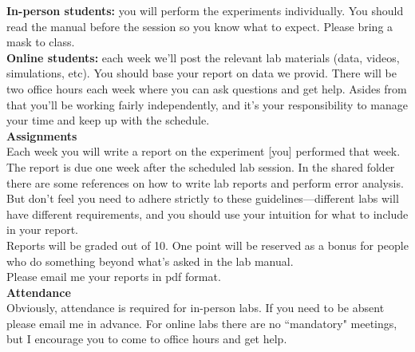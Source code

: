 \documentclass[11pt]{extarticle}
\begin{document}
{\bf In-person students:} you will perform the experiments individually. You should read the manual before the session so you know what to expect. Please bring a mask to class. \\ 

{\bf Online students:} each week we'll post the relevant lab materials (data, videos, simulations, etc). You should base your report on data we provid. There will be two office hours each week where you can ask questions and get help. Asides from that you'll be working fairly independently, and it's your responsibility to manage your time and keep up with the schedule. \\  

{\bf \Large Assignments} \\ 

Each week you will write a report on the experiment [you] performed that week. The report is due one week after the scheduled lab session. In the shared folder there are some references on how to write lab reports and perform error analysis. But don't feel you need to adhere strictly to these guidelines---different labs will have different requirements, and you should use your intuition for what to include in your report. \\ 

Reports will be graded out of 10. One point will be reserved as a bonus for people who do something beyond what's asked in the lab manual. \\ 

Please email me your reports in pdf format. \\ 

{\bf \Large Attendance} \\ 

Obviously, attendance is required for in-person labs. If you need to be absent please email me in advance. For online labs there are no ``mandatory" meetings, but I encourage you to come to office hours and get help. \\ 
\end{document}
